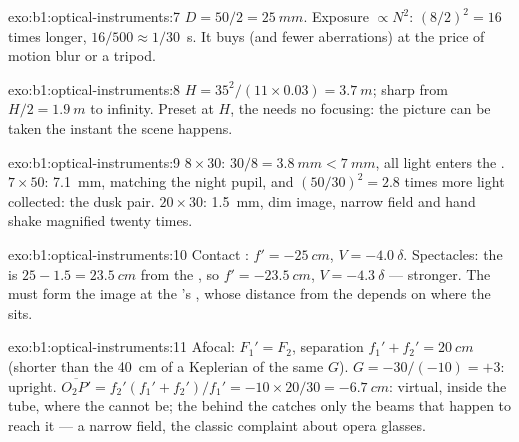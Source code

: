 \begin{solution}{exo:b1:optical-instruments:7}
$D = 50/2 = \qty{25}{mm}$. Exposure $\propto N^2$: $(8/2)^2 = 16$ times
longer, $16/500 \approx 1/30$~\unit{s}. It buys  (and
fewer aberrations) at the price of motion blur or a tripod.
\end{solution}

\begin{solution}{exo:b1:optical-instruments:8}
$H = 35^2/(11 \times 0.03) = \qty{3.7}{m}$; sharp from $H/2 =
\qty{1.9}{m}$ to infinity. Preset at $H$, the  needs no focusing:
the picture can be taken the instant the scene happens.
\end{solution}

\begin{solution}{exo:b1:optical-instruments:9}
$8\times30$:  $30/8 = \qty{3.8}{mm} < \qty{7}{mm}$, all light
enters the . $7\times50$: \qty{7.1}{mm}, matching the night pupil,
and $(50/30)^2 = 2.8$ times more light collected: the dusk pair.
$20\times30$:  \qty{1.5}{mm}, dim image, narrow field and
hand shake magnified twenty times.
\end{solution}

\begin{solution}{exo:b1:optical-instruments:10}
Contact : $f' = \qty{-25}{cm}$, $V = \qty{-4.0}{\delta}$. Spectacles:
the  is $25 - 1.5 = \qty{23.5}{cm}$ from the , so $f' =
\qty{-23.5}{cm}$, $V = \qty{-4.3}{\delta}$ --- stronger. The  must
form the image at the 's , whose distance from the 
depends on where the  sits.
\end{solution}

\begin{solution}{exo:b1:optical-instruments:11}
Afocal: $F_1' = F_2$, separation $f_1' + f_2' = \qty{20}{cm}$ (shorter
than the \qty{40}{cm} of a Keplerian of the same $G$). $G = -30/(-10) =
+3$: upright.  $\overline{O_2P'} = f_2'(f_1' + f_2')/f_1' =
-10 \times 20/30 = \qty{-6.7}{cm}$: virtual, inside the tube, where the
 cannot be; the  behind the  catches only the beams that
happen to reach it --- a narrow field, the classic complaint about opera
glasses.
\end{solution}

